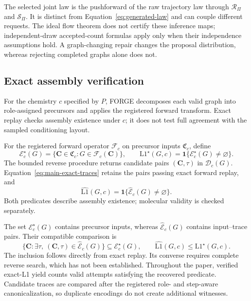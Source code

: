 The selected joint law is the pushforward of the raw trajectory law through
$\mathcal R_\Pi$ and $\mathcal S_\Pi$. It is distinct from Equation~\ref{eq:generated-law} and
can couple different requests. The ideal flow theorem does not certify these inference maps;
independent-draw accepted-count formulas apply only when their independence assumptions hold.
A graph-changing repair changes the proposal distribution, whereas rejecting completed graphs
alone does not.

\subsection{Exact assembly verification}
\label{app:verification}

For the chemistry $c$ specified by $P$, FORGE decomposes each valid graph into role-assigned
precursors and applies the registered forward transform. Exact replay checks assembly existence
under $c$; it does not test full agreement with the sampled conditioning layout.

\begin{definition}
\label{def:exact-assembly}
For the registered forward operator $\mathcal F_c$ on precursor inputs $\mathfrak C_c$, define
\begin{equation}
 \mathcal E_c^\star(G)=\{\mathbf C\in\mathfrak C_c:G\in\mathcal F_c(\mathbf C)\},\qquad
 \mathrm{L1}^\star(G,c)=\mathbf1\{\mathcal E_c^\star(G)\neq\varnothing\}.
\end{equation}
The bounded reverse procedure returns candidate pairs $(\mathbf C,\tau)$ in $\mathcal D_c(G)$.
Equation~\ref{eq:main-exact-traces} retains the pairs passing exact forward replay, and
\begin{equation}
 \widehat{\mathrm{L1}}(G,c)=\mathbf1\{\widehat{\mathcal E}_c(G)\neq\varnothing\}.
\end{equation}
Both predicates describe assembly existence; molecular validity is checked separately.
\end{definition}
The set $\mathcal E_c^\star(G)$ contains precursor inputs, whereas
$\widehat{\mathcal E}_c(G)$ contains input--trace pairs. Their compatible comparison is
\begin{equation}
 \{\mathbf C:\exists\tau,\ (\mathbf C,\tau)\in\widehat{\mathcal E}_c(G)\}
 \subseteq\mathcal E_c^\star(G),\qquad
 \widehat{\mathrm{L1}}(G,c)\leq\mathrm{L1}^\star(G,c).
\end{equation}
The inclusion follows directly from exact replay. Its converse requires complete reverse search,
which has not been established. Throughout the paper, verified exact-L1 yield counts valid
attempts satisfying the recovered predicate. Candidate traces are compared after the registered
role- and step-aware canonicalization, so duplicate encodings do not create additional witnesses.

